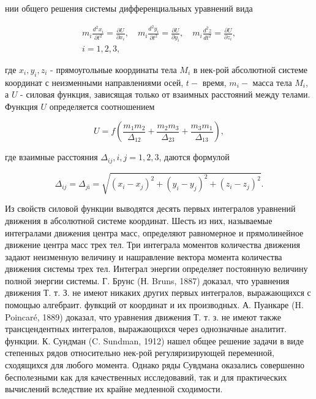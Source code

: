 \documentclass[10pt]{article}
\begin{document}
нии общего решения системы дифференциальных уравнений вида



\[

\begin{gathered}

m_{i} \frac{d^{2} x_{i}}{\partial t^{2}}=\frac{\partial U}{\partial x_{i}}, \quad m_{i} \frac{d^{2} y_{i}}{\partial t^{2}}=\frac{\partial U}{\partial y_{i}}, \quad m_{i} \frac{d^{2} z}{d t^{2}}=\frac{\partial U}{\partial z_{i}}, \\

i=1,2,3,

\end{gathered}

\]



где $x_{i}, y_{i}, z_{i}$ - прямоугольные координаты тела $M_{i}$ в нек-рой абсолютной системе координат с неизменными направлениями осей, $t-$ время, $m_{i}-$ масса тела $M_{i}$, а $U$ - силовая функция, зависящая только от взаимных расстояний между телами. Функция $U$ определяется соотношением



\[

U=f\left(\frac{m_{1} m_{2}}{\Delta_{12}}+\frac{m_{2} m_{3}}{\Delta_{23}}+\frac{m_{3} m_{1}}{\Delta_{13}}\right),

\]



где взаимные расстояния $\Delta_{i j}, i, j=1,2,3$, даются формулой



\[

\Delta_{i j}=\Delta_{j \mathrm{i}}=\sqrt{\left(x_{i}-x_{j}\right)^{2}+\left(y_{i}-y_{j}\right)^{2}+\left(z_{i}-z_{j}\right)^{2}} .

\]



Из свойств силовой функции выводятся десять первых интегралов уравнений движения в абсолютной системе координат. Шесть из них, называемые интегралами движения центра масс, определяют равномерное и прямолинейное движение центра масс трех тел. Три интеграла моментов количества движения задают неизменную величину и нашравление вектора момента количества движения системы трех тел. Интеграл энергии определяет постоянную величину полной энергии системы. Г. Брунс (Н. Bruns, 1887) доказал, что уравнения движения Т. т. З. не имеют никаких других первых интегралов, выражающихся с помощью алгебраит. фувкций от координат и их производных. А. Пуанкаре (H. Poincaré, 1889) доказал, что уравнения движения Т. т. з. не имеют также трансцендентных интегралов, выражающихся через однозначные аналитит. функции. К. Сундман (C. Sundman, 1912) нашел общее решение задачи в виде степенных рядов относительно нек-рой регуляризирующей переменной, сходящихся для любого момента. Однако ряды Сувдмана оказались совершенно бесполезными как для качественных исследовавий, так и для практических вычислений вследствие их крайне медленной сходимости.
\end{document}
